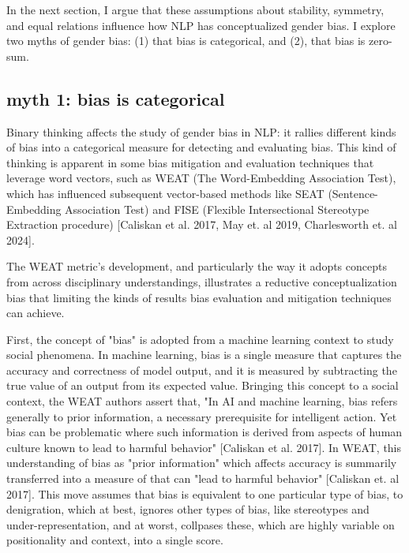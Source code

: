 \documentclass[11pt]{article}
\begin{document}
In the next section, I argue that these assumptions about stability,
symmetry, and equal relations influence how NLP has conceptualized
gender bias. I explore two myths of gender bias: (1) that bias is
categorical, and (2), that bias is zero-sum. 

\subsection{myth 1: bias is categorical}
\label{sec:org3c76789}
Binary thinking affects the study of gender bias in NLP: it rallies
different kinds of bias into a categorical measure for detecting and
evaluating bias. This kind of thinking is apparent in some bias
mitigation and evaluation techniques that leverage word vectors, such
as WEAT (The Word-Embedding Association Test), which has influenced
subsequent vector-based methods like SEAT (Sentence-Embedding
Association Test) and FISE (Flexible Intersectional Stereotype
Extraction procedure) [Caliskan et al. 2017, May et. al 2019,
Charlesworth et. al 2024].

The WEAT metric's development, and particularly the way it adopts
concepts from across disciplinary understandings, illustrates a
reductive conceptualization bias that limiting the kinds of results
bias evaluation and mitigation techniques can achieve.

First, the concept of "bias" is adopted from a machine learning
context to study social phenomena. In machine learning, bias is a
single measure that captures the accuracy and correctness of model
output, and it is measured by subtracting the true value of an output
from its expected value. Bringing this concept to a social context,
the WEAT authors assert that, "In AI and machine learning, bias refers
generally to prior information, a necessary prerequisite for
intelligent action. Yet bias can be problematic where such information
is derived from aspects of human culture known to lead to harmful
behavior" [Caliskan et al. 2017]. In WEAT, this understanding of bias
as "prior information" which affects accuracy is summarily transferred
into a measure of that can "lead to harmful behavior" [Caliskan et. al
2017]. This move assumes that bias is equivalent to one particular
type of bias, to denigration, which at best, ignores other types of
bias, like stereotypes and under-representation, and at worst,
collpases these, which are highly variable on positionality and
context, into a single score.
\end{document}
